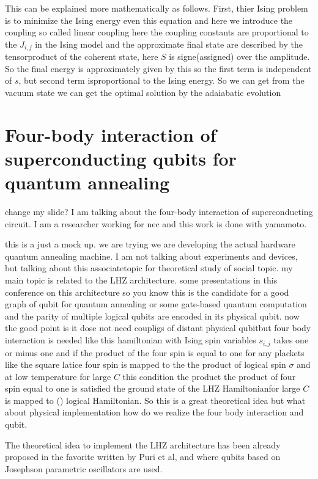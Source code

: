 This can be explained more mathematically as follows.
First, thier Ising problem is to minimize the Ising energy even this equation and here we introduce the coupling so called linear coupling here the coupling constants are proportional to the $J_{i,j}$ in the Ising model and the approximate final state are described by the tensorproduct of the coherent state, here $S$ is signe(assigned) over the amplitude.
So the final energy is approximately given by this so the first term is independent of $s$, but second term isproportional to the Ising energy.
So we can get from the vacuum state we can get the optimal solution by the adaiabatic evolution


\section{Four-body interaction of superconducting qubits for quantum annealing}
change my slide?
I am talking about the four-body interaction of superconducting circuit.
I am a researcher working for nec and this work is done with yamamoto.

this is a just a mock up.
we are trying  we are developing the actual hardware quantum annealing machine.
I am not talking about experiments and devices, but talking about this associatetopic for theoretical study of social topic.
my main topic is related to the LHZ architecture.
some presentations in this conference on this architecture so you know this is the candidate for a good graph of qubit for quantum annealing or some gate-based quantum computation and the parity of multiple logical qubits are encoded in its physical qubit.
now the good point is it dose not need coupligs of distant physical qubitbut four body interaction is needed like this hamiltonian with Ising spin variables $s_{i,j}$ takes one or minus one and if the product of the four spin is equal to one for any plackets like the square latice four spin is mapped to the the product of logical spin $\sigma$ and at low temperature for large $C$ this condition the product the product of four spin equal to one is satisfied the ground state of the LHZ Hamiltonianfor large $C$ is mapped to () logical Hamiltonian.
So this is a great theoretical idea but what about physical implementation how do we realize the four body interaction and qubit.


The theoretical idea to implement the LHZ architecture has been already proposed in the favorite written by Puri et al, and where qubits based on Josephson parametric oscillators are used.


